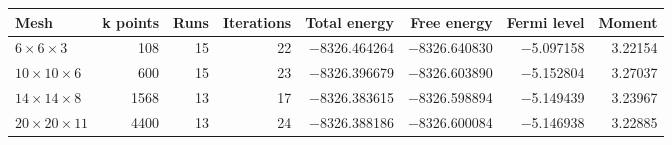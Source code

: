 \begin{tabular}{lrrrrrrr}
\toprule
Mesh & k points & Runs & Iterations & Total energy & Free energy & Fermi level & Moment \\
\midrule
$6\times6\times3$ & \num{108} & 15 & 22 & \num{-8326.464264} & \num{-8326.640830} & \num{-5.097158} & \num{3.22154} \\
$10\times10\times6$ & \num{600} & 15 & 23 & \num{-8326.396679} & \num{-8326.603890} & \num{-5.152804} & \num{3.27037} \\
$14\times14\times8$ & \num{1568} & 13 & 17 & \num{-8326.383615} & \num{-8326.598894} & \num{-5.149439} & \num{3.23967} \\
$20\times20\times11$ & \num{4400} & 13 & 24 & \num{-8326.388186} & \num{-8326.600084} & \num{-5.146938} & \num{3.22885} \\
\bottomrule
\end{tabular}
